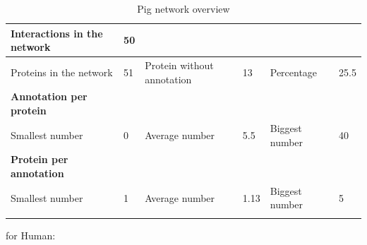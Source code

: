 \documentclass[10pt,a4paper]{article}
\begin{document}
\begin{enumerate}
	\begin{table}[H]
		\centering
		\caption{Pig network overview}
		\vspace*{1mm}
		\label{pignetworkoverview}
		\begin{tabular}{llllll}
			\hline
			\multicolumn{1}{|l|}{Interactions in the network}     & \multicolumn{1}{l|}{50} & \multicolumn{1}{l|}{}                           & \multicolumn{1}{l|}{}    & \multicolumn{1}{l|}{}               & \multicolumn{1}{l|}{}     \\ \hline
			\multicolumn{1}{|l|}{Proteins in the network}         & \multicolumn{1}{l|}{51} & \multicolumn{1}{l|}{Protein without annotation} & \multicolumn{1}{l|}{13}  & \multicolumn{1}{l|}{Percentage}     & \multicolumn{1}{l|}{25.5} \\ \hline
			\multicolumn{1}{|l|}{\textbf{Annotation per protein}} & \multicolumn{1}{l|}{}   & \multicolumn{1}{l|}{}                           & \multicolumn{1}{l|}{}    & \multicolumn{1}{l|}{}               & \multicolumn{1}{l|}{}     \\ \hline
			\multicolumn{1}{|l|}{Smallest number}                 & \multicolumn{1}{l|}{0}  & \multicolumn{1}{l|}{Average number}             & \multicolumn{1}{l|}{5.5} & \multicolumn{1}{l|}{Biggest number} & \multicolumn{1}{l|}{40}   \\ \hline
			\multicolumn{1}{|l|}{\textbf{Protein per annotation}} & \multicolumn{1}{l|}{}   & \multicolumn{1}{l|}{}                           & \multicolumn{1}{l|}{}    & \multicolumn{1}{l|}{}               & \multicolumn{1}{l|}{}     \\ \hline
			\multicolumn{1}{|l|}{Smallest number}                 & \multicolumn{1}{l|}{1}  & \multicolumn{1}{l|}{Average number}             & \multicolumn{1}{l|}{1.13} & \multicolumn{1}{l|}{Biggest number} & \multicolumn{1}{l|}{5} \\ \hline
			&                         &                                                 &                          &                                     &                          
		\end{tabular}
	\end{table}
	
	
	for Human: 
	

\end{enumerate}
\end{document}
